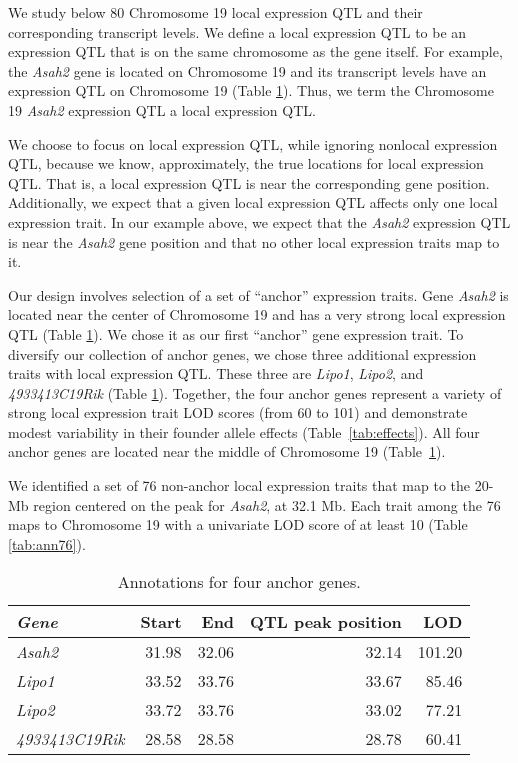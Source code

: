 \documentclass[oneside]{book}
\begin{document}
We study below 80 Chromosome 19 local expression QTL and their corresponding transcript levels. We define a local expression QTL to be an expression QTL that is on the same chromosome as the gene itself. For example, the \emph{Asah2} gene is located on Chromosome 19 and its transcript levels have an expression QTL on Chromosome 19 (Table \ref{tab:ann4}). Thus, we term the Chromosome 19 \emph{Asah2} expression QTL a local expression QTL.

We choose to focus on local expression QTL, while ignoring nonlocal expression QTL, because we know, approximately, the true locations for local expression QTL. That is, a local expression QTL is near the corresponding gene position. Additionally, we expect that a given local expression QTL affects only one local expression trait. In our example above, we expect that the \emph{Asah2} expression QTL is near the \emph{Asah2} gene position and that no other local expression traits map to it.


Our design involves selection of a set of ``anchor'' expression traits. Gene \emph{Asah2} is located near the center of Chromosome 19 and has a very strong local expression QTL (Table \ref{tab:ann4}). We chose it as our first ``anchor'' gene expression trait. To diversify our collection of anchor genes, we chose three additional expression traits with local expression QTL. These three are \emph{Lipo1}, \emph{Lipo2}, and \emph{4933413C19Rik} (Table \ref{tab:ann4}). Together, the four anchor genes represent a variety of strong local expression trait LOD scores (from 60 to 101) and demonstrate modest variability in their founder allele effects (Table~\ref{tab:effects}). All four anchor genes are located near the middle of Chromosome 19 (Table~\ref{tab:ann4}).




We identified a set of 76 non-anchor local expression traits that map to the 20-Mb region centered on the peak for \emph{Asah2}, at 32.1 Mb. Each trait among the 76 maps to Chromosome 19 with a univariate LOD score of at least 10 (Table \ref{tab:ann76}).


\begin{table}[ht]
\caption{Annotations for four anchor genes.}\label{tab:ann4}
\centering
\begin{tabular}{>{\em}lrrrr}
  \hline
Gene & Start & End & QTL peak position & LOD \\
  \hline
Asah2 & 31.98 & 32.06 & 32.14 & 101.20 \\
  Lipo1 & 33.52 & 33.76 & 33.67 & 85.46 \\
  Lipo2 & 33.72 & 33.76 & 33.02 & 77.21 \\
  4933413C19Rik & 28.58 & 28.58 & 28.78 & 60.41 \\
   \hline
\end{tabular}
\end{table}
\end{document}
